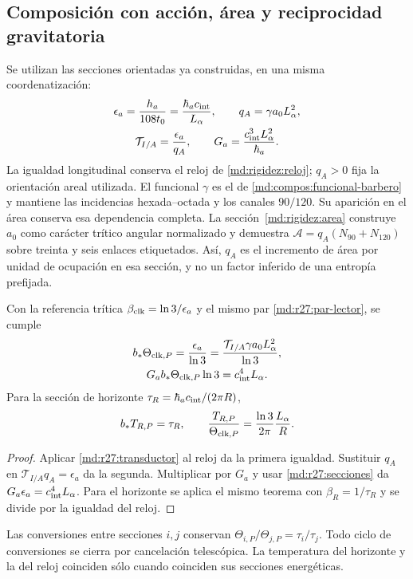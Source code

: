\subsection{Composición con acción, área y reciprocidad gravitatoria}
\label{md:r27:composicion}
Se utilizan las secciones orientadas ya construidas, en una misma coordenatización:
\begin{equation}
 \begin{gathered}
 \epsilon_a=\frac{h_a}{108t_0}=\frac{\hbar_a c_{\rm int}}{L_\alpha},
 \qquad q_A=\gamma a_0L_\alpha^2,\\
 \mathcal T_{I/A}=\frac{\epsilon_a}{q_A},\qquad
 G_a=\frac{c_{\rm int}^3L_\alpha^2}{\hbar_a}.
 \end{gathered}
 \label{md:r27:secciones}
\end{equation}
La igualdad longitudinal conserva el reloj de
\eqref{md:rigidez:reloj}; $q_A>0$ fija la orientación areal utilizada.
El funcional $\gamma$ es el de \eqref{md:compos:funcional-barbero} y mantiene
las incidencias hexada--octada y los canales $90/120$. Su aparición en el área
conserva esa dependencia completa. La sección~\ref{md:rigidez:area}
construye $a_0$ como carácter trítico angular normalizado y demuestra
$\mathcal A=q_A(N_{90}+N_{120})$ sobre treinta y seis enlaces etiquetados.
Así, $q_A$ es el incremento de área por unidad de ocupación en esa sección,
y no un factor inferido de una entropía prefijada.

\begin{corollary}
Con la referencia trítica $\beta_{\rm clk}=\ln3/\epsilon_a$ y el mismo par
\eqref{md:r27:par-lector}, se cumple
\begin{equation}
 \begin{gathered}
 b_*\Theta_{{\rm clk},P}
 =\frac{\epsilon_a}{\ln3}
 =\frac{\mathcal T_{I/A}\gamma a_0L_\alpha^2}{\ln3},\\
 G_a b_*\Theta_{{\rm clk},P}\ln3=c_{\rm int}^4L_\alpha.
 \end{gathered}
 \label{md:r27:area-gravedad}
\end{equation}
Para la sección de horizonte $\tau_R=\hbar_a c_{\rm int}/(2\pi R)$,
\begin{equation}
 b_*T_{R,P}=\tau_R,\qquad
 \frac{T_{R,P}}{\Theta_{{\rm clk},P}}
 =\frac{\ln3}{2\pi}\frac{L_\alpha}{R}.
 \label{md:r27:horizonte}
\end{equation}
\end{corollary}
\begin{proof}
Aplicar \eqref{md:r27:transductor} al reloj da la primera igualdad.
Sustituir $q_A$ en $\mathcal T_{I/A}q_A=\epsilon_a$ da la segunda.
Multiplicar por $G_a$ y usar \eqref{md:r27:secciones} da
$G_a\epsilon_a=c_{\rm int}^4L_\alpha$. Para el horizonte se aplica el mismo
teorema con $\beta_R=1/\tau_R$ y se divide por la igualdad del reloj.
\end{proof}
Las conversiones entre secciones $i,j$ conservan
$\Theta_{i,P}/\Theta_{j,P}=\tau_i/\tau_j$. Todo ciclo de conversiones
se cierra por cancelación telescópica. La temperatura del horizonte y la del
reloj coinciden sólo cuando coinciden sus secciones energéticas.

